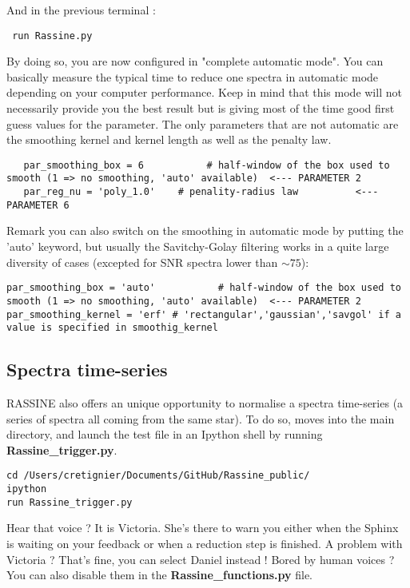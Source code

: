 \documentclass{article}
\begin{document}
 And in the previous terminal : 
 
 \begin{lstlisting}
 run Rassine.py 
 \end{lstlisting}
 
 By doing so, you are now configured in "complete automatic mode". You can basically measure the typical time to reduce one spectra in automatic mode depending on your computer performance. Keep in mind that this mode will not necessarily provide you the best result but is giving most of the time good first guess values for the parameter. The only parameters that are not automatic are the smoothing kernel and kernel length as well as the penalty law.
 
   \begin{lstlisting}
   par_smoothing_box = 6           # half-window of the box used to smooth (1 => no smoothing, 'auto' available)  <--- PARAMETER 2
   par_reg_nu = 'poly_1.0'    # penality-radius law          <--- PARAMETER 6
  \end{lstlisting}

Remark you can also switch on the smoothing in automatic mode by putting the 'auto' keyword, but usually the Savitchy-Golay filtering works in a quite large diversity of cases (excepted for SNR spectra lower than $\sim75$): 

   \begin{lstlisting}
par_smoothing_box = 'auto'           # half-window of the box used to smooth (1 => no smoothing, 'auto' available)  <--- PARAMETER 2
par_smoothing_kernel = 'erf' # 'rectangular','gaussian','savgol' if a value is specified in smoothig_kernel
\end{lstlisting}

\newpage
\subsection{Spectra time-series}
\label{timeseries}

RASSINE also offers an unique opportunity to normalise a spectra time-series (a series of spectra all coming from the same star). To do so, moves into the main directory, and launch the test file in an Ipython shell by running \textbf{Rassine\_trigger.py}.

\begin{lstlisting}
cd /Users/cretignier/Documents/GitHub/Rassine_public/
ipython 
run Rassine_trigger.py 
\end{lstlisting}

Hear that voice ? It is Victoria. She's there to warn you either when the Sphinx is waiting on your feedback or when a reduction step is finished. A problem with Victoria ? That's fine, you can select Daniel instead ! Bored by human voices ? You can also disable them in the \textbf{Rassine\_functions.py} file. 
\end{document}

